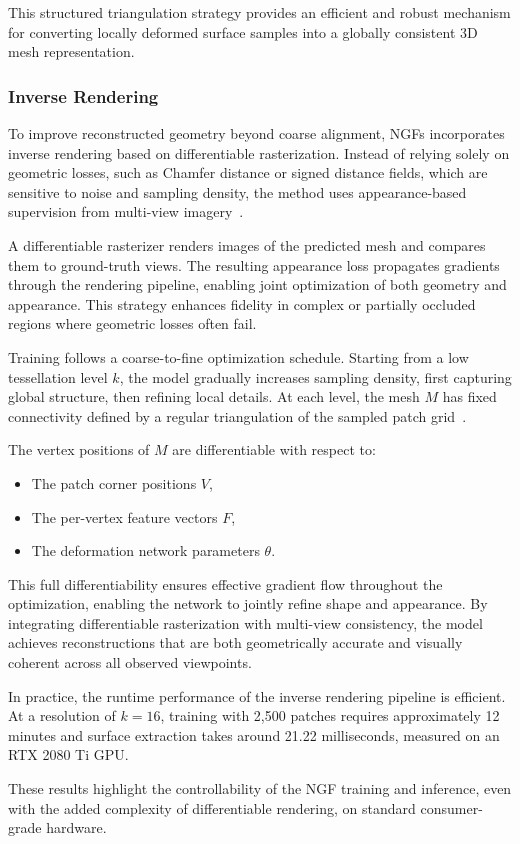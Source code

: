 This structured triangulation strategy provides an efficient and robust mechanism for converting locally deformed surface samples into a globally consistent 3D mesh representation.

\subsubsection{Inverse Rendering}

To improve reconstructed geometry beyond coarse alignment, NGFs incorporates inverse rendering based on differentiable rasterization.
Instead of relying solely on geometric losses, such as Chamfer distance or signed distance fields, which are sensitive to noise and sampling density, the method uses appearance-based supervision from multi-view imagery~\cite{Hasselgren2021}.

A differentiable rasterizer renders images of the predicted mesh and compares them to ground-truth views.
The resulting appearance loss propagates gradients through the rendering pipeline, enabling joint optimization of both geometry and appearance.
This strategy enhances fidelity in complex or partially occluded regions where geometric losses often fail.

Training follows a coarse-to-fine optimization schedule.
Starting from a low tessellation level $k$, the model gradually increases sampling density, first capturing global structure, then refining local details.
At each level, the mesh $M$ has fixed connectivity defined by a regular triangulation of the sampled patch grid~\cite{sivaram2024}.

The vertex positions of $M$ are differentiable with respect to:
\begin{itemize}
    \item The patch corner positions $V$,
    \item The per-vertex feature vectors $F$,
    \item The deformation network parameters $\theta$.
\end{itemize}

This full differentiability ensures effective gradient flow throughout the optimization, enabling the network to jointly refine shape and appearance.
By integrating differentiable rasterization with multi-view consistency, the model achieves reconstructions that are both geometrically accurate and visually coherent across all observed viewpoints.

In practice, the runtime performance of the inverse rendering pipeline is efficient. 
At a resolution of $k = 16$, training with 2,500 patches requires approximately 12 minutes and surface extraction takes around 21.22 milliseconds, measured on an RTX 2080 Ti GPU.

These results highlight the controllability of the NGF training and inference, even with the added complexity of differentiable rendering, on standard consumer-grade hardware.